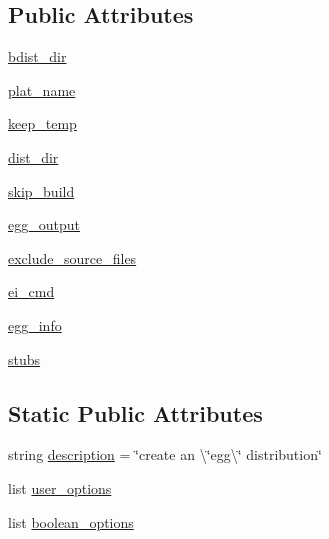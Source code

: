 \subsection*{Public Attributes}
\begin{DoxyCompactItemize}
\item 
\hyperlink{classsetuptools_1_1command_1_1bdist__egg_1_1bdist__egg_a32b7373558697e1b843885ac1b9b9f80}{bdist\+\_\+dir}
\item 
\hyperlink{classsetuptools_1_1command_1_1bdist__egg_1_1bdist__egg_a6336ff216efe48ca45956611ed223888}{plat\+\_\+name}
\item 
\hyperlink{classsetuptools_1_1command_1_1bdist__egg_1_1bdist__egg_a2555cb62790306478e063514959fcca3}{keep\+\_\+temp}
\item 
\hyperlink{classsetuptools_1_1command_1_1bdist__egg_1_1bdist__egg_a4a93325179b5418e468b6e48c51edd65}{dist\+\_\+dir}
\item 
\hyperlink{classsetuptools_1_1command_1_1bdist__egg_1_1bdist__egg_abb9224020349f0490e768a1199ceb493}{skip\+\_\+build}
\item 
\hyperlink{classsetuptools_1_1command_1_1bdist__egg_1_1bdist__egg_a2060988e40d8ddc08eb084f873170498}{egg\+\_\+output}
\item 
\hyperlink{classsetuptools_1_1command_1_1bdist__egg_1_1bdist__egg_af17758c4b939b1fa91b10db1eb02a179}{exclude\+\_\+source\+\_\+files}
\item 
\hyperlink{classsetuptools_1_1command_1_1bdist__egg_1_1bdist__egg_a76ba48a979a663a403e92d34fd5d0c28}{ei\+\_\+cmd}
\item 
\hyperlink{classsetuptools_1_1command_1_1bdist__egg_1_1bdist__egg_a280f35f1dcbc9775b6b8d802aa0c83f4}{egg\+\_\+info}
\item 
\hyperlink{classsetuptools_1_1command_1_1bdist__egg_1_1bdist__egg_aa7cc5f6bb0bea739aed5fa363eb3efd5}{stubs}
\end{DoxyCompactItemize}
\subsection*{Static Public Attributes}
\begin{DoxyCompactItemize}
\item 
string \hyperlink{classsetuptools_1_1command_1_1bdist__egg_1_1bdist__egg_a5bf058d1faaa4b8f7d162917423ff82b}{description} = \char`\"{}create an \textbackslash{}\char`\"{}egg\textbackslash{}\char`\"{} distribution\char`\"{}
\item 
list \hyperlink{classsetuptools_1_1command_1_1bdist__egg_1_1bdist__egg_a625526ef011d3aad26b056ce2e947b79}{user\+\_\+options}
\item 
list \hyperlink{classsetuptools_1_1command_1_1bdist__egg_1_1bdist__egg_a3494599e563087cc3d5a9934cc7aa873}{boolean\+\_\+options}
\end{DoxyCompactItemize}


